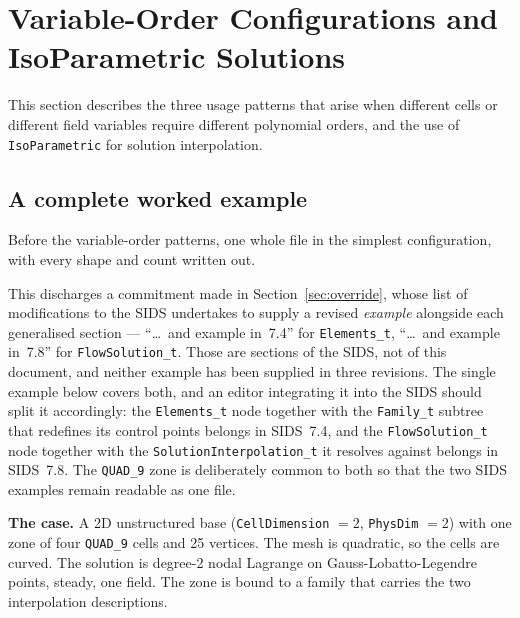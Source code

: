 \documentclass[11pt,letterpaper]{article}
\newif\ifvfourdraft
\newenvironment{v4block}{\ifvfourdraft\color{v4violet}\fi\ignorespaces}{\par}
\newcommand{\vfourmark}{\ifvfourdraft\textcolor{v4violet}{\textbf{[v4]}}\ \fi}
\begin{document}
\section{Variable-Order Configurations and IsoParametric Solutions}
\label{sec:variable-order}

This section describes the three usage patterns that arise when different cells or different
field variables require different polynomial orders, and the use of \texttt{IsoParametric}
for solution interpolation.

\begin{v4block}
\subsection{\vfourmark A complete worked example}
\label{sec:worked-example}

Before the variable-order patterns, one whole file in the simplest configuration,
with every shape and count written out.

This discharges a commitment made in Section~\ref{sec:override}, whose list of
modifications to the SIDS undertakes to supply a revised \emph{example} alongside
each generalised section --- ``\dots\ and example in~7.4'' for
\texttt{Elements\_t}, ``\dots\ and example in~7.8'' for \texttt{FlowSolution\_t}.
Those are sections of the SIDS, not of this document, and neither example has been
supplied in three revisions.  The single example below covers both, and an editor
integrating it into the SIDS should split it accordingly: the \texttt{Elements\_t}
node together with the \texttt{Family\_t} subtree that redefines its control points
belongs in SIDS~7.4, and the \texttt{FlowSolution\_t} node together with the
\texttt{SolutionInterpolation\_t} it resolves against belongs in SIDS~7.8.  The
\texttt{QUAD\_9} zone is deliberately common to both so that the two SIDS examples
remain readable as one file.

\smallskip
\noindent\textbf{The case.}  A 2D unstructured base
(\texttt{CellDimension} $=2$, \texttt{PhysDim} $=2$) with one zone of four
\texttt{QUAD\_9} cells and 25 vertices.  The mesh is quadratic, so the cells are
curved.  The solution is degree-2 nodal Lagrange on Gauss-Lobatto-Legendre points,
steady, one field.  The zone is bound to a family that carries the two
interpolation descriptions.


\end{v4block}
\end{document}
